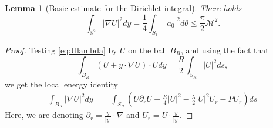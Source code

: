 \documentclass[12pt,reqno]{amsart}
\theoremstyle{plain}
\newtheorem{lemma}[theorem]{Lemma}
\theoremstyle{definition}
\newcommand{\R}{\mathbb{R}}
\newcommand{\M}{\mathcal{M}}
\renewcommand{\:}{\colon}
\numberwithin{equation}{section}
\numberwithin{figure}{section}
\begin{document}
\begin{lemma}[Basic estimate for the Dirichlet integral]\label{b-en-global} There holds
    \begin{equation} \label{eq:energy-global}
        \int_{\R^2} |\nabla U|^2 dy = \frac{1}{4} \int_{S_1} |a_0|^2 d\theta  \leq \frac{\pi}{2} \M^2.
    \end{equation}
\end{lemma}

\begin{proof}
     Testing \eqref{eq:Ulambda} by $U$ on the ball $B_R$, and using the fact that
    \begin{equation}
        \int_{B_R} (U+y\cdot \nabla U) \cdot U dy =  \frac{R}{2} \int_{S_R} |U|^2 ds,
    \end{equation}
    we get the local energy identity
    \begin{align} \label{eq:energy-BR}
        \int_{B_R} |\nabla U|^2 dy &=  \int_{S_R} \left( U \partial_r U + \frac{R}{4}  |U|^2 - \frac{\lambda}{2}    |U|^2 U_r - P U_r  \right) ds %
    \end{align}
    Here, we are denoting $\partial_r  = \frac{y}{|y|} \cdot \nabla$ and $U_r = U \cdot \frac{y}{|y|}$. 
    
    
    

\end{proof}
\end{document}

